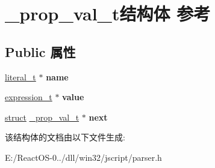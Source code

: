 \hypertarget{struct__prop__val__t}{}\section{\+\_\+prop\+\_\+val\+\_\+t结构体 参考}
\label{struct__prop__val__t}
\subsection*{Public 属性}
\begin{DoxyCompactItemize}
\item 
\mbox{\label{struct__prop__val__t_ab16969e342c83b4cada9a123bfc2c1c4}} 
\hyperlink{structliteral__t}{literal\+\_\+t} $\ast$ {\bfseries name}
\item 
\mbox{\label{struct__prop__val__t_a74789c38d7f60f19c38e40a8113ee8a5}} 
\hyperlink{struct__expression__t}{expression\+\_\+t} $\ast$ {\bfseries value}
\item 
\mbox{\label{struct__prop__val__t_ac94f361dc85cc32cf6e9fc189cf916ea}} 
\hyperlink{interfacestruct}{struct} \hyperlink{struct__prop__val__t}{\+\_\+prop\+\_\+val\+\_\+t} $\ast$ {\bfseries next}
\end{DoxyCompactItemize}


该结构体的文档由以下文件生成\+:\begin{DoxyCompactItemize}
\item 
E\+:/\+React\+O\+S-\/0../dll/win32/jscript/parser.\+h\end{DoxyCompactItemize}
